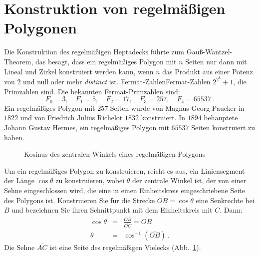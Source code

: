 \section{Konstruktion von regelmäßigen Polygonen}\label{s.hept-regular}

Die Konstruktion des regelmäßigen Heptadecks führte zum Gauß-Wantzel-Theorem, das besagt, dass ein regelmäßiges Polygon mit $n$ Seiten nur dann mit Lineal und Zirkel konstruiert werden kann, wenn $n$ das Produkt aus einer Potenz von $2$ und null oder mehr \emph{distinct} ist. Fermat-Zahlen{Fermat-Zahlen} $2^{2^k}+1$, die Primzahlen sind. Die bekannten Fermat-Primzahlen sind:
\[
F_0=3,\quad F_1=5,\quad F_2=17,\quad F_3=257,\quad F_4=65537\,.
\]
Ein regelmäßiges Polygon mit $257$ Seiten wurde von Magnus Georg Paucker in $1822$ und von Friedrich Julius Richelot $1832$ konstruiert. In $1894$ behauptete Johann Gustav Hermes, ein regelmäßiges Polygon mit $65537$ Seiten konstruiert zu haben.

\begin{figure}[b]
\begin{center}
\end{center}
\caption{Kosinus des zentralen Winkels eines regelmäßigen Polygons}\label{f.hept-central1}
\end{figure}

Um ein regelmäßiges Polygon zu konstruieren, reicht es aus, ein Liniensegment der Länge $\cos \theta$ zu konstruieren, wobei $\theta$ der zentrale Winkel ist, der von einer Sehne eingeschlossen wird, die eine in einen Einheitskreis eingeschriebene Seite des Polygons ist. Konstruieren Sie für die Strecke $\overline{OB}=\cos\theta$ eine Senkrechte bei $B$ und bezeichnen Sie ihren Schnittpunkt mit dem Einheitskreis mit $C$. Dann:
\begin{eqnarray*}
\cos \theta&=&\displaystyle\frac{\overline{OB}}{\overline{OC}}=\overline{OB}\\
\theta &=& \cos^{-1} (\overline{OB})\,.
\end{eqnarray*}
Die Sehne $\overline{AC}$ ist eine Seite des regelmäßigen Vielecks (Abb.~\ref{f.hept-central1}).

